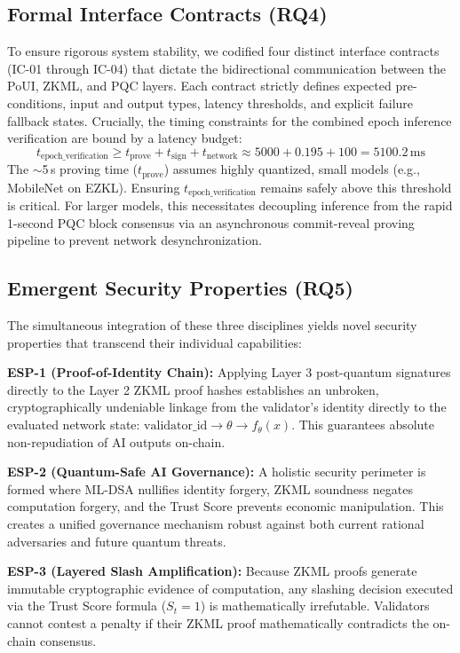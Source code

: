 \documentclass[journal]{IEEEtran}
\begin{document}
\subsection{Formal Interface Contracts (RQ4)}

To ensure rigorous system stability, we codified four distinct interface contracts (IC-01 through IC-04) that dictate the bidirectional communication between the PoUI, ZKML, and PQC layers. Each contract strictly defines expected pre-conditions, input and output types, latency thresholds, and explicit failure fallback states. 
Crucially, the timing constraints for the combined epoch inference verification are bound by a latency budget:
\[
  t_{\text{epoch\_verification}} \geq t_{\text{prove}} + t_{\text{sign}} + t_{\text{network}} \approx 5000 + 0.195 + 100 = 5100.2\,\text{ms}
\]
The $\sim$5\,s proving time ($t_{\text{prove}}$) assumes highly quantized, small models (e.g., MobileNet on EZKL). Ensuring $t_{\text{epoch\_verification}}$ remains safely above this threshold is critical. For larger models, this necessitates decoupling inference from the rapid 1-second PQC block consensus via an asynchronous commit-reveal proving pipeline to prevent network desynchronization.

\subsection{Emergent Security Properties (RQ5)}

The simultaneous integration of these three disciplines yields novel security properties that transcend their individual capabilities:

\textbf{ESP-1 (Proof-of-Identity Chain):}
Applying Layer 3 post-quantum signatures directly to the Layer 2 ZKML proof hashes establishes an unbroken, cryptographically undeniable linkage from the validator's identity directly to the evaluated network state: $\text{validator\_id} \to \theta \to f_\theta(x)$. This guarantees absolute non-repudiation of AI outputs on-chain.

\textbf{ESP-2 (Quantum-Safe AI Governance):}
A holistic security perimeter is formed where ML-DSA nullifies identity forgery, ZKML soundness negates computation forgery, and the Trust Score prevents economic manipulation. This creates a unified governance mechanism robust against both current rational adversaries and future quantum threats.

\textbf{ESP-3 (Layered Slash Amplification):}
Because ZKML proofs generate immutable cryptographic evidence of computation, any slashing decision executed via the Trust Score formula ($S_t = 1$) is mathematically irrefutable. Validators cannot contest a penalty if their ZKML proof mathematically contradicts the on-chain consensus.
\end{document}
